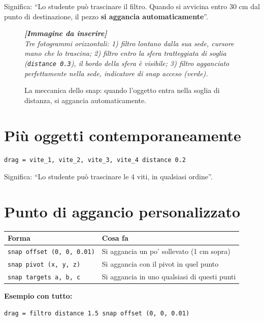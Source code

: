 ﻿\documentclass[a4paper,12pt,oneside]{book}
\newcommand{\val}[1]{\texttt{\color{cvtgreen}#1}}
\newcommand{\imgph}[2]{%
  \begin{tcolorbox}[colback=cvtlightblue!30,colframe=cvtblue!40,%
    width=#1,halign=center,valign=center,height=5cm,boxrule=0.5pt,arc=3pt]%
    \textcolor{cvtgray}{\itshape\footnotesize\textbf{[Immagine da inserire]}\\[3pt]#2}%
  \end{tcolorbox}}
\begin{document}
Significa: ``Lo studente può trascinare il filtro. Quando si avvicina entro
30 cm dal punto di destinazione, il pezzo \textbf{si aggancia automaticamente}''.

\begin{figure}[H]
  \centering
  \imgph{13cm}{Tre fotogrammi orizzontali: 1) filtro lontano dalla sua sede, cursore mano che lo trascina; 2) filtro entro la sfera tratteggiata di soglia (\texttt{distance 0.3}), il bordo della sfera è visibile; 3) filtro agganciato perfettamente nella sede, indicatore di snap acceso (verde).}
  \caption{La meccanica dello snap: quando l'oggetto entra nella soglia di distanza, si aggancia automaticamente.}
  \label{fig:snap-sequenza}
\end{figure}

\section{Più oggetti contemporaneamente}

\begin{lstlisting}
drag = vite_1, vite_2, vite_3, vite_4 distance 0.2
\end{lstlisting}

Significa: ``Lo studente può trascinare le 4 viti, in qualsiasi ordine''.

\section{Punto di aggancio personalizzato}

\begin{longtable}{@{}lp{9cm}@{}}
\toprule
\textbf{Forma} & \textbf{Cosa fa} \\
\midrule
\val{snap offset (0, 0, 0.01)}      & Si aggancia un po' sollevato (1 cm sopra) \\
\val{snap pivot (x, y, z)}          & Si aggancia con il pivot in quel punto \\
\val{snap targets a, b, c}          & Si aggancia in uno qualsiasi di questi punti \\
\bottomrule
\end{longtable}

\textbf{Esempio con tutto:}

\begin{lstlisting}
drag = filtro distance 1.5 snap offset (0, 0, 0.01)
\end{lstlisting}
\end{document}

